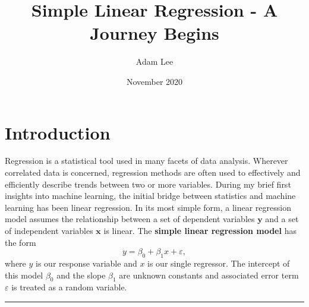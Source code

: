 \documentclass[10pt,a4paper, twocolumn, conference]{IEEEtran}
\author{Adam Lee}
\title{Simple Linear Regression - A Journey Begins}
\date{November 2020}
\begin{document}
\maketitle
\pagebreak
\section{Introduction}
Regression is a statistical tool used in many facets of data analysis.  Wherever correlated data is concerned, regression methods are often used to effectively and efficiently describe trends between two or more variables. During my brief first insights into machine learning, the initial bridge between statistics and machine learning has been linear regression. In its most simple form, a linear regression model assumes the relationship between a set of dependent variables $\mathbf{y}$ and a set of independent variables $\mathbf{x}$ is linear. The \textbf{simple linear regression model} has the form
\begin{equation} \label{eq1}
y = \beta_0 + \beta_1 x + \varepsilon,
\end{equation}
where $y$ is our response variable and $x$ is our single regressor. The intercept of this model $\beta_0$ and the slope $\beta_1$ are unknown constants and associated error term $\varepsilon$ is treated as a random variable.
\vspace{3mm}
\hrule
\end{document}
